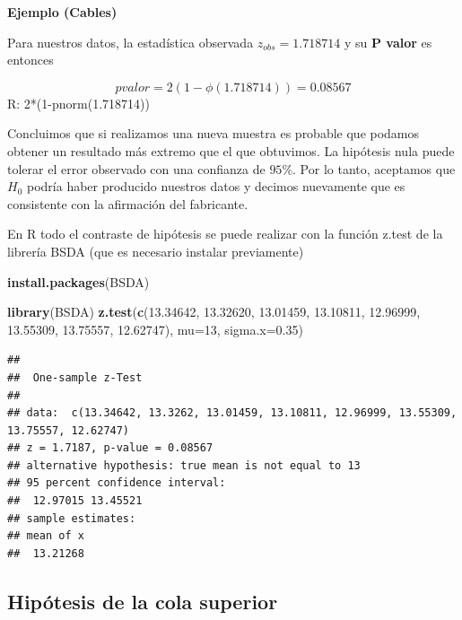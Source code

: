 \documentclass[
]{book}
\newenvironment{Shaded}{\begin{snugshade}}{\end{snugshade}}
\newcommand{\AttributeTok}[1]{\textcolor[rgb]{0.13,0.29,0.53}{#1}}
\newcommand{\DecValTok}[1]{\textcolor[rgb]{0.00,0.00,0.81}{#1}}
\newcommand{\FloatTok}[1]{\textcolor[rgb]{0.00,0.00,0.81}{#1}}
\newcommand{\FunctionTok}[1]{\textcolor[rgb]{0.13,0.29,0.53}{\textbf{#1}}}
\newcommand{\NormalTok}[1]{#1}
\begin{document}
\textbf{Ejemplo (Cables)}

Para nuestros datos, la estadística observada \(z_{obs}=1.718714\) y su \textbf{P valor} es entonces

\[pvalor=2 (1-\phi(1.718714))=0.08567\]
R: 2*(1-pnorm(1.718714))

Concluimos que si realizamos una nueva muestra es probable que podamos obtener un resultado más extremo que el que obtuvimos. La hipótesis nula puede tolerar el error observado con una confianza de \(95\%\). Por lo tanto, aceptamos que \(H_0\) podría haber producido nuestros datos y decimos nuevamente que es consistente con la afirmación del fabricante.

En R todo el contraste de hipótesis se puede realizar con la función z.test de la librería BSDA (que es necesario instalar previamente)

\begin{Shaded}
\begin{Highlighting}[]
\FunctionTok{install.packages}\NormalTok{(BSDA) }
\end{Highlighting}
\end{Shaded}

\begin{Shaded}
\begin{Highlighting}[]
\FunctionTok{library}\NormalTok{(BSDA) }
\FunctionTok{z.test}\NormalTok{(}\FunctionTok{c}\NormalTok{(}\FloatTok{13.34642}\NormalTok{, }\FloatTok{13.32620}\NormalTok{, }\FloatTok{13.01459}\NormalTok{, }\FloatTok{13.10811}\NormalTok{, }
         \FloatTok{12.96999}\NormalTok{, }\FloatTok{13.55309}\NormalTok{, }\FloatTok{13.75557}\NormalTok{, }\FloatTok{12.62747}\NormalTok{), }
       \AttributeTok{mu=}\DecValTok{13}\NormalTok{, }
       \AttributeTok{sigma.x=}\FloatTok{0.35}\NormalTok{)}
\end{Highlighting}
\end{Shaded}

\begin{verbatim}
## 
##  One-sample z-Test
## 
## data:  c(13.34642, 13.3262, 13.01459, 13.10811, 12.96999, 13.55309,     13.75557, 12.62747)
## z = 1.7187, p-value = 0.08567
## alternative hypothesis: true mean is not equal to 13
## 95 percent confidence interval:
##  12.97015 13.45521
## sample estimates:
## mean of x 
##  13.21268
\end{verbatim}

\hypertarget{hipuxf3tesis-de-la-cola-superior}{%
\subsection{Hipótesis de la cola superior}\label{hipuxf3tesis-de-la-cola-superior}}
\end{document}
